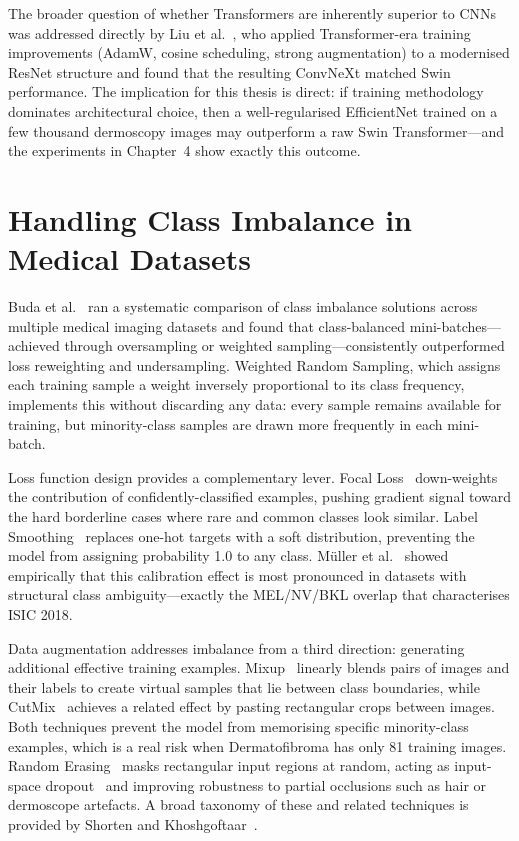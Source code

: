 \documentclass[11pt,a4paper]{report}
\begin{document}
The broader question of whether Transformers are inherently superior to CNNs was addressed directly by Liu et al.~\cite{liu2022convnext}, who applied Transformer-era training improvements (AdamW, cosine scheduling, strong augmentation) to a modernised ResNet structure and found that the resulting ConvNeXt matched Swin performance. The implication for this thesis is direct: if training methodology dominates architectural choice, then a well-regularised EfficientNet trained on a few thousand dermoscopy images may outperform a raw Swin Transformer---and the experiments in Chapter~4 show exactly this outcome.

\section{Handling Class Imbalance in Medical Datasets}

Buda et al.~\cite{buda2018systematic} ran a systematic comparison of class imbalance solutions across multiple medical imaging datasets and found that class-balanced mini-batches---achieved through oversampling or weighted sampling---consistently outperformed loss reweighting and undersampling. Weighted Random Sampling, which assigns each training sample a weight inversely proportional to its class frequency, implements this without discarding any data: every sample remains available for training, but minority-class samples are drawn more frequently in each mini-batch.

Loss function design provides a complementary lever. Focal Loss~\cite{lin2017focal} down-weights the contribution of confidently-classified examples, pushing gradient signal toward the hard borderline cases where rare and common classes look similar. Label Smoothing~\cite{szegedy2016rethinking} replaces one-hot targets with a soft distribution, preventing the model from assigning probability 1.0 to any class. Müller et al.~\cite{muller2019does} showed empirically that this calibration effect is most pronounced in datasets with structural class ambiguity---exactly the MEL/NV/BKL overlap that characterises ISIC 2018.

Data augmentation addresses imbalance from a third direction: generating additional effective training examples. Mixup~\cite{zhang2018mixup} linearly blends pairs of images and their labels to create virtual samples that lie between class boundaries, while CutMix~\cite{yun2019cutmix} achieves a related effect by pasting rectangular crops between images. Both techniques prevent the model from memorising specific minority-class examples, which is a real risk when Dermatofibroma has only 81 training images. Random Erasing~\cite{zhong2020random} masks rectangular input regions at random, acting as input-space dropout~\cite{srivastava2014dropout} and improving robustness to partial occlusions such as hair or dermoscope artefacts. A broad taxonomy of these and related techniques is provided by Shorten and Khoshgoftaar~\cite{shorten2019survey}.
\end{document}
